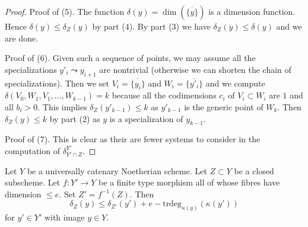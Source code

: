 \begin{proof}
\medskip\noindent
Proof of (5). The function $\delta(y) = \dim(\overline{\{y\}})$
is a dimension function. Hence $\delta(y) \leq \delta_Z(y)$ by
part (4). By part (3) we have $\delta_Z(y) \leq \delta(y)$
and we are done.

\medskip\noindent
Proof of (6). Given such a sequence of points, we may assume
all the specializations $y'_i \leadsto y_{i + 1}$ are nontrivial
(otherwise we can shorten the chain of specializations).
Then we set $V_i = \overline{\{y_i\}}$ and $W_i = \overline{\{y'_i\}}$
and we compute $\delta(V_0, W_1, V_1, \ldots, W_{k - 1}) = k$ because all
the codimensions $c_i$ of $V_i \subset W_i$ are $1$ and all $b_i > 0$.
This implies $\delta_Z(y'_{k - 1}) \leq k$ as $y'_{k - 1}$ is the generic
point of $W_k$. Then $\delta_Z(y) \leq k$ by part (2) as $y$ is a
specialization of $y_{k - 1}$.

\medskip\noindent
Proof of (7). This is clear as their are fewer systems to consider
in the computation of $\delta^{Y'}_{Y' \cap Z}$.
\end{proof}

\begin{lemma}
\label{lemma-change-distance-function}
Let $Y$ be a universally catenary Noetherian scheme. Let $Z \subset Y$
be a closed subscheme. Let $f : Y' \to Y$ be a finite type
morphism all of whose fibres have dimension $\leq e$. Set $Z' = f^{-1}(Z)$.
Then
$$
\delta_Z(y) \leq \delta_{Z'}(y') + e - \text{trdeg}_{\kappa(y)}(\kappa(y'))
$$
for $y' \in Y'$ with image $y \in Y$.
\end{lemma}


